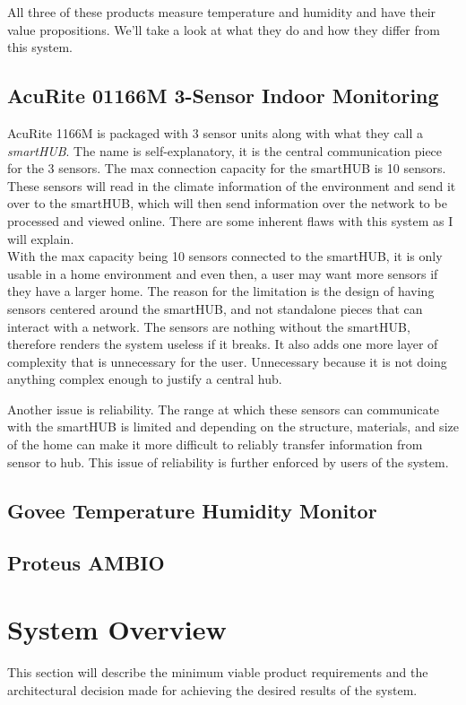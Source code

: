 \documentclass{article}
\begin{document}
All three of these products measure temperature and humidity and have their value propositions. We'll take a look at what they do and how they differ from this system.

\subsection{AcuRite 01166M 3-Sensor Indoor Monitoring}
AcuRite 1166M is packaged with 3 sensor units along with what they call a \textit{smartHUB}. The name is self-explanatory, it is the central communication piece for the 3 sensors. The max connection capacity for the smartHUB is 10 sensors. These sensors will read in the climate information of the environment and send it over to the smartHUB, which will then send information over the network to be processed and viewed online. There are some inherent flaws with this system as I will explain.\\

With the max capacity being 10 sensors connected to the smartHUB, it is only usable in a home environment and even then, a user may want more sensors if they have a larger home. The reason for the limitation is the design of having sensors centered around the smartHUB, and not standalone pieces that can interact with a network. The sensors are nothing without the smartHUB, therefore renders the system useless if it breaks. It also adds one more layer of complexity that is unnecessary for the user. Unnecessary because it is not doing anything complex enough to justify a central hub.

Another issue is reliability. The range at which these sensors can communicate with the smartHUB is limited and depending on the structure, materials, and size of the home can make it more difficult to reliably transfer information from sensor to hub. This issue of reliability is further enforced by users of the system.

\subsection{Govee Temperature Humidity Monitor}
\subsection{Proteus AMBIO}

\section{System Overview}
\label{section:overview}
This section will describe the minimum viable product requirements and the architectural decision made for achieving the desired results of the system.
\end{document}
